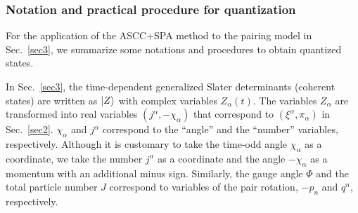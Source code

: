 \documentclass[%
superscriptaddress,
showpacs,
nofootinbib,
amsmath,amssymb,
aps,
prc,
twocolumn,
floatfix ]%
{revtex4-1}
\begin{document}
\subsubsection{Notation and practical procedure for quantization}
\label{sec:notation}

For the application of the ASCC+SPA method to the pairing model in Sec.~\ref{sec3},
we summarize some notations and procedures to obtain quantized states.

In Sec.~\ref{sec3}, the time-dependent generalized Slater determinants
(coherent states) are written as $\ket{Z}$ with complex variables
$Z_\alpha(t)$.
The variables $Z_\alpha$ are transformed into real variables
$(j^\alpha, -\chi_\alpha)$ that correspond to $(\xi^\alpha,\pi_\alpha)$
in Sec.~\ref{sec2}.
$\chi_\alpha$ and $j^\alpha$ correspond to
the ``angle'' and the ``number'' variables, respectively.
Although it is customary to take the time-odd angle $\chi_\alpha$ as a coordinate,
we take the number $j^\alpha$ as a coordinate and the angle $-\chi_\alpha$ as a momentum with an additional minus sign.
Similarly, the gauge angle $\Phi$ and the total particle number $J$
correspond to variables of the pair rotation, $-p_n$ and $q^n$, respectively.


\end{document}
